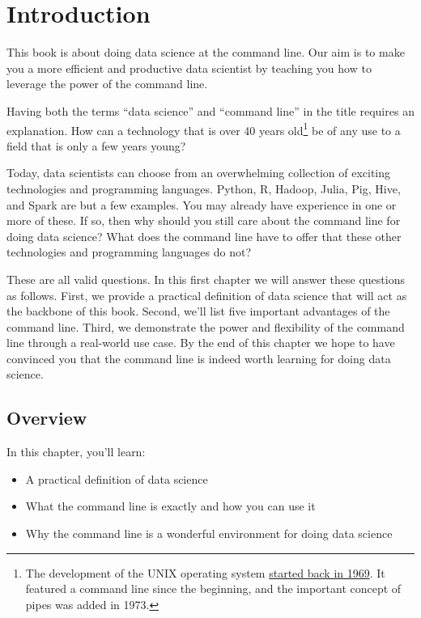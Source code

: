 \documentclass[
]{book}
\providecommand{\tightlist}{%
  \setlength{\itemsep}{0pt}\setlength{\parskip}{0pt}}
\theoremstyle{definition}
\theoremstyle{definition}
\theoremstyle{definition}
\theoremstyle{remark}
\begin{document}
\hypertarget{chapter-1-introduction}{%
\chapter{Introduction}\label{chapter-1-introduction}}

This book is about doing data science at the command line. Our aim is to make you a more efficient and productive data scientist by teaching you how to leverage the power of the command line.

Having both the terms ``data science'' and ``command line'' in the title requires an explanation. How can a technology that is over 40 years old\footnote{The development of the UNIX operating system \href{http://www.unix.org/what_is_unix/history_timeline.html}{started back in 1969}. It featured a command line since the beginning, and the important concept of pipes was added in 1973.} be of any use to a field that is only a few years young?

Today, data scientists can choose from an overwhelming collection of exciting technologies and programming languages. Python, R, Hadoop, Julia, Pig, Hive, and Spark are but a few examples. You may already have experience in one or more of these. If so, then why should you still care about the command line for doing data science? What does the command line have to offer that these other technologies and programming languages do not?

These are all valid questions. In this first chapter we will answer these questions as follows. First, we provide a practical definition of data science that will act as the backbone of this book. Second, we'll list five important advantages of the command line. Third, we demonstrate the power and flexibility of the command line through a real-world use case. By the end of this chapter we hope to have convinced you that the command line is indeed worth learning for doing data science.

\hypertarget{overview}{%
\section{Overview}\label{overview}}

In this chapter, you'll learn:

\begin{itemize}
\tightlist
\item
  A practical definition of data science
\item
  What the command line is exactly and how you can use it
\item
  Why the command line is a wonderful environment for doing data science
\end{itemize}
\end{document}
